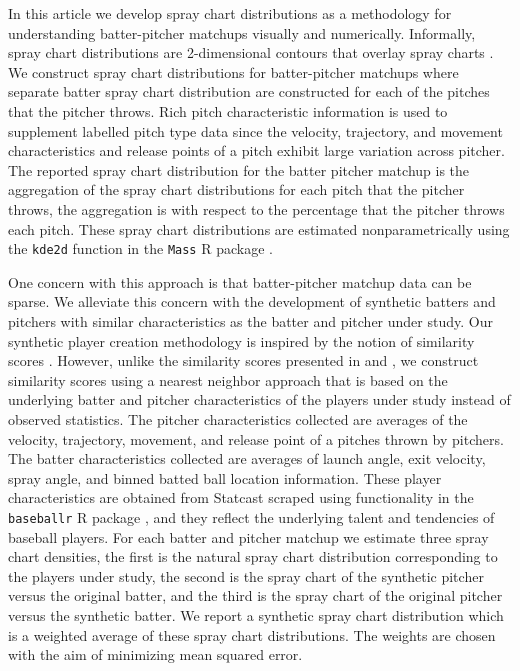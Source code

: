 \documentclass[11pt]{article}
\begin{document}
In this article we develop spray chart distributions as a methodology for understanding batter-pitcher matchups visually and numerically. Informally, spray chart distributions are 2-dimensional contours that overlay spray charts \citep{pettispray, marchi2019analyzing}. We construct spray chart distributions for batter-pitcher matchups where separate batter spray chart distribution are constructed for each of the pitches that the pitcher throws. Rich pitch characteristic information is used to supplement labelled pitch type data since the velocity, trajectory, and movement characteristics and release points of a pitch exhibit large variation across pitcher. The reported spray chart distribution for the batter pitcher matchup is the aggregation of the spray chart distributions for each pitch that the pitcher throws, the aggregation is with respect to the percentage that the pitcher throws each pitch. These spray chart distributions are estimated nonparametrically using the \texttt{kde2d} function in the \texttt{Mass} R package \citep{MASS}.

One concern with this approach is that batter-pitcher matchup data can be sparse. We alleviate this concern with the development of synthetic batters and pitchers with similar characteristics as the batter and pitcher under study. Our synthetic player creation methodology is inspired by the notion of similarity scores \citep{james1994politics, PECOTA}. However, unlike the similarity scores presented in \cite{james1994politics} and \cite{PECOTA}, we construct similarity scores using a nearest neighbor approach that is based on the underlying batter and pitcher characteristics of the players under study instead of observed statistics. The pitcher characteristics collected are averages of the velocity, trajectory, movement, and release point of a pitches thrown by pitchers. The batter characteristics collected are averages of launch angle, exit velocity, spray angle, and binned batted ball location information. These player characteristics are obtained from Statcast scraped using functionality in the \texttt{baseballr} R package \citep{baseballr}, and they reflect the underlying talent and tendencies of baseball players. For each batter and pitcher matchup we estimate three spray chart densities, the first is the natural spray chart distribution corresponding to the players under study, the second is the spray chart of the synthetic pitcher versus the original batter, and the third is the spray chart of the original pitcher versus the synthetic batter. We report a synthetic spray chart distribution which is a weighted average of these spray chart distributions. The weights are chosen with the aim of minimizing mean squared error.
\end{document}
